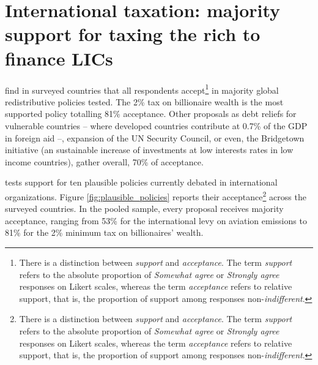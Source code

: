 
\section{International taxation: majority support for taxing the rich to finance LICs}



\citet{fabre_public_2026} find in surveyed countries that all respondents accept\footnote{There is a distinction between \textit{support} and \textit{acceptance}. The term \textit{support} refers to the absolute proportion of \textit{Somewhat agree} or \textit{Strongly agree} responses on Likert scales, whereas the term \textit{acceptance} refers to relative support, that is, the proportion of support among responses non-\textit{indifferent}.} in majority global redistributive policies tested. The 2\% tax on billionaire wealth is the most supported policy totalling 81\% acceptance. Other proposals as debt reliefs for vulnerable countries -- where developed countries contribute at 0.7\% of the GDP in foreign aid --, expansion of the UN Security Council, or even, the Bridgetown initiative (an sustainable increase of investments at low interests rates in low income countries), gather overall, 70\% of acceptance. 

\citet{fabre_public_2026} tests support for ten plausible policies currently debated in international organizations. Figure \ref{fig:plausible_policies} reports their acceptance\footnote{There is a distinction between \textit{support} and \textit{acceptance}. The term \textit{support} refers to the absolute proportion of \textit{Somewhat agree} or \textit{Strongly agree} responses on Likert scales, whereas the term \textit{acceptance} refers to relative support, that is, the proportion of support among responses non-\textit{indifferent}.} across the surveyed countries. In the pooled sample, every proposal receives majority acceptance, ranging from 53\% for the international levy on aviation emissions to 81\% for the 2\% minimum tax on billionaires' wealth.

